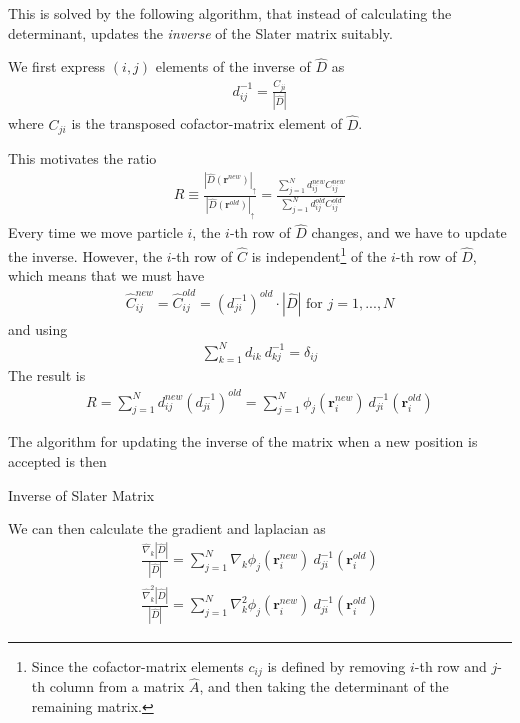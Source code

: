 \documentclass[twocolumns, a4paper,11pt,fleqn]{extarticle}
\newcommand{\eq}[1]{{\small\begin{align*}#1\end{align*}}}
\renewcommand\vec[1]{\boldsymbol{\mathbf{#1}}}
\newcommand{\op}[1]{\hat{#1}}
\begin{document}
This is solved by the following algorithm, that instead of calculating 
the determinant, updates the \textit{inverse} of the Slater matrix suitably.

We first express $(i,j)$ elements of the inverse of $\op D$ as
\eq{
  d_{ij}^{-1} = \frac{C_{ji}}{|\op D|}
}
where $C_{ji}$ is the transposed cofactor-matrix element of $\op D$.

This motivates the ratio
\eq{
  R \equiv \frac{|\op D(\vec r^{new})|_{\uparrow}}{|\op D(\vec r^{old})|_{\uparrow}} 
  = \frac{\sum_{j=1}^N d_{ij}^{new} C_{ij}^{new}}
    {\sum_{j=1}^N d_{ij}^{old} C_{ij}^{old}}
}
Every time we move particle $i$, the $i$-th row of $\op D$ changes,
and we have to update the inverse. However, the $i$-th row of $\op C$
is independent\footnote{Since the cofactor-matrix elements $c_{ij}$ is defined by 
removing $i$-th row and $j$-th column from a matrix $\op A$,
and then taking the determinant of the remaining matrix.} 
of the $i$-th row of $\op D$, which means that
we must have
\eq{
  \op C_{ij}^{new} = \op C_{ij}^{old} = (d_{ji}^{-1})^{old}\cdot |\op D| 
    \text{ for } j=1,...,N
}
and using
\eq{
  \sum_{k=1}^N d_{ik}\ d_{kj}^{-1} =\delta_{ij}
}
The result is
\eq{
  R=\sum_{j=1}^N d_{ij}^{new} (d_{ji}^{-1})^{old}
    =\sum_{j=1}^N \phi_j(\vec r_i^{new})\ d_{ji}^{-1} (\vec r_i^{old})
}

The algorithm for updating the inverse of the matrix 
when a new position is accepted is then

\begin{algorithm}
	\caption{Inverse of Slater Matrix}\label{algo1}
  \begin{algorithmic}[1]
      \State{$ S_j = \sum_{l=1}^N d_{il}(\vec r^{new}) d_{lj}^{-1}(\vec r^{old}) $}
    \EndFor
    \EndProcedure
    \EndProcedure
  \end{algorithmic}
\end{algorithm}

We can then calculate the gradient and laplacian as
\eq{
  \frac{\op\nabla_k |\op D|}{|\op D|} 
    = \sum_{j=1}^N \nabla_k \phi_j(\vec r_i^{new})\ d_{ji}^{-1} (\vec r_i^{old})\\
  \frac{\op\nabla_k^2 |\op D|}{|\op D|} 
    = \sum_{j=1}^N \nabla_k^2 \phi_j(\vec r_i^{new})\ d_{ji}^{-1} (\vec r_i^{old})
}
\end{document}
